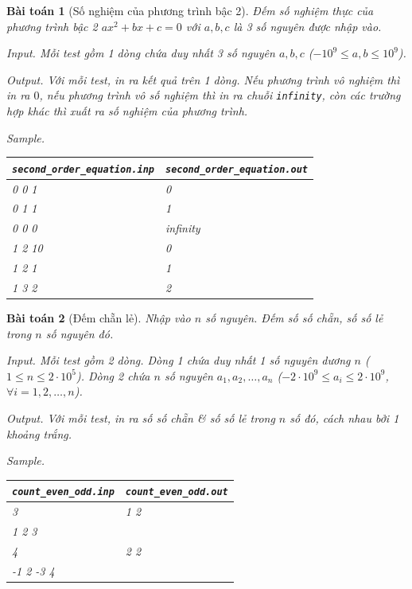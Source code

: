 \documentclass[12pt]{article}
\newtheorem{baitoan}{Bài toán}
\begin{document}
\begin{baitoan}[Số nghiệm của phương trình bậc 2]
    Đếm số nghiệm thực của phương trình bậc 2 $ax^2 + bx + c = 0$ với $a, b, c$ là 3 số nguyên được nhập vào.
    \item {\sf Input.} Mỗi test gồm 1 dòng chứa duy nhất 3 số nguyên $a,b,c$ ($-10^9\le a,b\le10^9$).
    \item {\sf Output.} Với mỗi test, in ra kết quả trên 1 dòng. Nếu phương trình vô nghiệm thì in ra $0$, nếu phương trình vô số nghiệm thì in ra chuỗi {\tt infinity}, còn các trường hợp khác thì xuất ra số nghiệm của phương trình.
    \item {\sf Sample.}
    \begin{table}[H]
        \centering
        \begin{tabular}{|l|l|}
            \hline
            \verb|second_order_equation.inp| & \verb|second_order_equation.out| \\
            \hline
            0 0 1 & 0 \\
            \hline
            0 1 1 & 1 \\
            \hline
            0 0 0 & infinity \\
            \hline
            1 2 10 & 0 \\
            \hline
            1 2 1 & 1 \\
            \hline
            1 3 2 & 2 \\
            \hline
        \end{tabular}
    \end{table}
\end{baitoan}

\begin{baitoan}[Đếm chẵn lẻ]
    Nhập vào $n$ số nguyên. Đếm số số chẵn, số số lẻ trong $n$ số nguyên đó.
    \item {\sf Input.} Mỗi test gồm 2 dòng. Dòng 1 chứa duy nhất 1 số nguyên dương $n$ ($1\le n\le2\cdot10^5$). Dòng 2 chứa $n$ số nguyên $a_1,a_2,\ldots,a_n$ ($-2\cdot10^9\le a_i\le2\cdot10^9$, $\forall i = 1,2,\ldots,n$).
    \item {\sf Output.} Với mỗi test, in ra số số chẵn \& số số lẻ trong $n$ số đó, cách nhau bởi 1 khoảng trắng.
    \item {\sf Sample.}
    \begin{table}[H]
        \centering
        \begin{tabular}{|l|l|}
            \hline
            \verb|count_even_odd.inp| & \verb|count_even_odd.out| \\
            \hline
            3 & 1 2 \\
            1 2 3 & \\
            \hline
            4 & 2 2 \\
            -1 2 -3 4 & \\
            \hline
        \end{tabular}
    \end{table}
\end{baitoan}


\printbibliography[heading=bibintoc]
\end{document}
